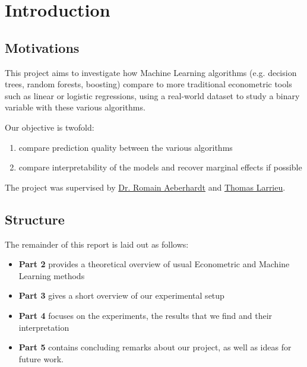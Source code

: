 \chapter{Introduction}

\section{Motivations}
This project aims to investigate how Machine Learning algorithms (e.g. decision trees, random
forests, boosting) compare to more traditional econometric tools such as linear or logistic
regressions, using a real-world dataset \cite{enquete} to study a binary variable with these
various algorithms.

Our objective is twofold:
\begin{enumerate}[nosep]
    \item compare prediction quality between the various algorithms
    \item compare interpretability of the models and recover marginal effects if possible
\end{enumerate}

The project was supervised by \href{http://www.crest.fr/pagesperso.php?user=3045}{Dr. Romain
Aeberhardt} and \href{http://thomas-larrieu.strikingly.com/}{Thomas Larrieu}.

\section{Structure}
The remainder of this report is laid out as follows:
    \begin{itemize}
        \item \textbf{Part 2} provides a theoretical overview of usual Econometric and Machine Learning methods
        \item \textbf{Part 3} gives a short overview of our experimental setup
        \item \textbf{Part 4} focuses on the experiments, the results that we find and their interpretation
        \item \textbf{Part 5} contains concluding remarks about our project, as well as ideas for future work.
    \end{itemize}

